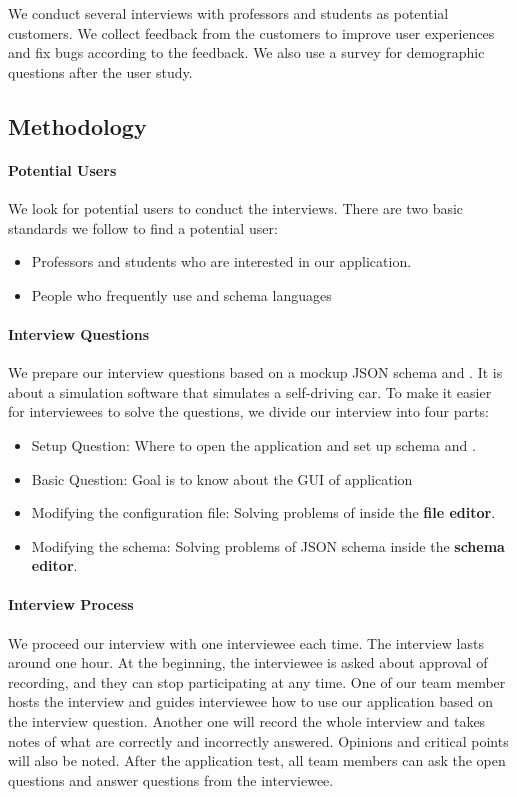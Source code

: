 We conduct several interviews with professors and students as potential customers.
We collect feedback from the customers to improve user experiences and fix bugs according to the feedback.
We also use a survey for demographic questions after the user study.

\subsection{Methodology}\label{subsec:methodology}

\paragraph{Potential Users}
We look for potential users to conduct the interviews.
There are two basic standards we follow to find a potential user:
\begin{itemize}
    \item Professors and students who are interested in our application.
    \item People who frequently use \cfgfiles and schema languages
\end{itemize}

\paragraph{Interview Questions}
We prepare our interview questions based on a mockup JSON schema and \cfgfiles.
It is about a simulation software that simulates a self-driving car.
To make it easier for interviewees to solve the questions, we divide our interview into four parts:
\begin{itemize}
    \item Setup Question: Where to open the application and set up schema and \cfgfiles.
    \item Basic Question: Goal is to know about the GUI of application
    \item Modifying the configuration file: Solving problems of \cfgfiles inside the \textbf{file editor}.
    \item Modifying the schema: Solving problems of JSON schema inside the \textbf{schema editor}.
\end{itemize}

\paragraph{Interview Process}
We proceed our interview with one interviewee each time.
The interview lasts around one hour.
At the beginning, the interviewee is asked about approval of recording, and they can stop participating at any time.
One of our team member hosts the interview and guides interviewee how to use our application based on the interview question.
Another one will record the whole interview and takes notes of what are correctly and incorrectly answered.
Opinions and critical points will also be noted.
After the application test, all team members can ask the open questions and answer questions from the interviewee.

